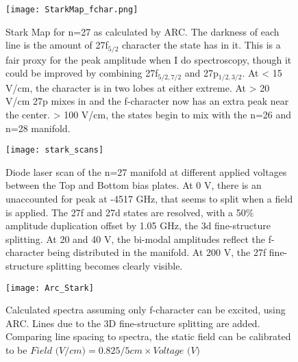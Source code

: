\documentclass{article}
\begin{document}
\begin{figure}
	\texttt{[image: StarkMap\_fchar.png]}
	\caption{Stark Map for n=27 as calculated by ARC. The darkness of each line is the amount of 27f$_{5/2}$ character the state has in it. This is a fair proxy for the peak amplitude when I do spectroscopy, though it could be improved by combining 27f$_{5/2,7/2}$ and 27p$_{1/2,3/2}$. At < 15 V/cm, the character is in two lobes at either extreme. At > 20 V/cm 27p mixes in and the f-character now has an extra peak near the center. > 100 V/cm, the states begin to mix with the n=26 and n=28 manifold.}
	\label{fig:Starkf}
\end{figure}

\begin{figure}
	\texttt{[image: stark\_scans]}
	\caption{Diode laser scan of the n=27 manifold at different applied voltages between the Top and Bottom bias plates. At 0 V, there is an unaccounted for peak at -4517 GHz, that seems to split when a field is applied. The 27f and 27d states are resolved, with a 50\% amplitude duplication offset by 1.05 GHz, the 3d fine-structure splitting. At 20 and 40 V, the bi-modal amplitudes reflect the f-character being distributed in the manifold. At 200 V, the 27f fine-structure splitting becomes clearly visible.}
	\label{fig:stark}
\end{figure}

\begin{figure}
	\texttt{[image: Arc\_Stark]}
	\caption{Calculated spectra assuming only f-character can be excited, using ARC. Lines due to the 3D fine-structure splitting are added. Comparing line spacing to spectra, the static field can be calibrated to be $\textit{Field (V/cm)} = 0.825 / 5 cm \times \textit{Voltage (V)}$}
	\label{fig:ARCStark}
\end{figure}
\end{document}
